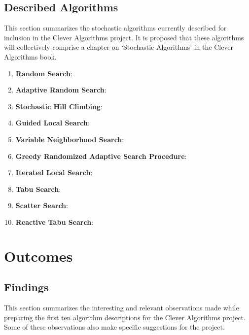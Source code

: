 \documentclass[a4paper, 11pt]{article}
\begin{document}
% 
% 
\subsection{Described Algorithms}
\label{subsec:algorithms}
This section summarizes the stochastic algorithms currently described for inclusion in the Clever Algorithms project. It is proposed that these algorithms will collectively comprise a chapter on `Stochastic Algorithms' in the Clever Algorithms book. 

\begin{enumerate}
	\item \textbf{Random Search}: \cite{Brownlee2010g}
	\item \textbf{Adaptive Random Search}: \cite{Brownlee2010h}
	\item \textbf{Stochastic Hill Climbing}: \cite{Brownlee2010i}
	\item \textbf{Guided Local Search}: \cite{Brownlee2010j}
	\item \textbf{Variable Neighborhood Search}: \cite{Brownlee2010e}
	\item \textbf{Greedy Randomized Adaptive Search Procedure}: \cite{Brownlee2010d}
	\item \textbf{Iterated Local Search}: \cite{Brownlee2010k}
	\item \textbf{Tabu Search}: \cite{Brownlee2010f}
	\item \textbf{Scatter Search}: \cite{Brownlee2010l}
	\item \textbf{Reactive Tabu Search}: \cite{Brownlee2010m}
\end{enumerate}

% 
% 
\section{Outcomes}
\label{sec:outcomes}

% 
% 
\subsection{Findings}
This section summarizes the interesting and relevant observations made while preparing the first ten algorithm descriptions for the Clever Algorithms project. Some of these observations also make specific suggestions for the project. 
\end{document}
